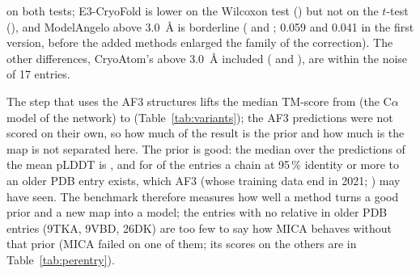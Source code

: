 on both tests; E3-CryoFold is lower on the Wilcoxon test (\PwHolmTmEthree{}) but not on the $t$-test (\PtHolmTmEthree{}), and ModelAngelo above 3.0~\AA{} is borderline (\PwHolmTmAngeloHigh{} and \PtHolmTmAngeloHigh{}; 0.059 and 0.041 in the first version, before the added methods enlarged the family of the correction). The other differences, CryoAtom's above 3.0~\AA{} included (\PwHolmTmCryoatomHigh{} and \PtHolmTmCryoatomHigh{}), are within the noise of 17 entries.

The step that uses the AF3 structures lifts the median TM-score from \MicaVarInitTmMed{} (the C$\alpha$ model of the network) to \MicaVarAllTmMed{} (Table~\ref{tab:variants}); the AF3 predictions were not scored on their own, so how much of the result is the prior and how much is the map is not separated here. The prior is good: the median over the predictions of the mean pLDDT is \AfPlddtMed{}, and for \NIdentHigh{} of the \NEntries{} entries a chain at 95\,\% identity or more to an older PDB entry exists, which AF3 (whose training data end in 2021; \citealp{abramson2024af3}) may have seen. The benchmark therefore measures how well a method turns a good prior and a new map into a model; the \NIdentLow{} entries with no relative in older PDB entries (9TKA, 9VBD, 26DK) are too few to say how MICA behaves without that prior (MICA failed on one of them; its scores on the others are in Table~\ref{tab:perentry}).

